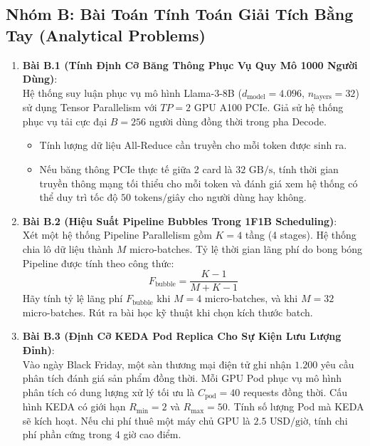\subsection{Nhóm B: Bài Toán Tính Toán Giải Tích Bằng Tay (Analytical Problems)}
\begin{enumerate}
  \item \textbf{Bài B.1 (Tính Định Cỡ Băng Thông Phục Vụ Quy Mô 1000 Người Dùng)}: \\
  Hệ thống suy luận phục vụ mô hình Llama-3-8B ($d_{\text{model}} = 4.096$, $n_{\text{layers}} = 32$) sử dụng Tensor Parallelism với $TP = 2$ GPU A100 PCIe.
  Giả sử hệ thống phục vụ tải cực đại $B = 256$ người dùng đồng thời trong pha Decode.
  \begin{itemize}
    \item[a)] Tính lượng dữ liệu All-Reduce cần truyền cho mỗi token được sinh ra.
    \item[b)] Nếu băng thông PCIe thực tế giữa 2 card là $32\text{ GB/s}$, tính thời gian truyền thông mạng tối thiểu cho mỗi token và đánh giá xem hệ thống có thể duy trì tốc độ $50\text{ tokens/giây}$ cho người dùng hay không.
  \end{itemize}

  \item \textbf{Bài B.2 (Hiệu Suất Pipeline Bubbles Trong 1F1B Scheduling)}: \\
  Xét một hệ thống Pipeline Parallelism gồm $K = 4$ tầng (4 stages).
  Hệ thống chia lô dữ liệu thành $M$ micro-batches.
  Tỷ lệ thời gian lãng phí do bong bóng Pipeline được tính theo công thức:
  \begin{equation*}
  F_{\text{bubble}} = \frac{K - 1}{M + K - 1}
  \end{equation*}
  Hãy tính tỷ lệ lãng phí $F_{\text{bubble}}$ khi $M = 4$ micro-batches, và khi $M = 32$ micro-batches. Rút ra bài học kỹ thuật khi chọn kích thước batch.

  \item \textbf{Bài B.3 (Định Cỡ KEDA Pod Replica Cho Sự Kiện Lưu Lượng Đỉnh)}: \\
  Vào ngày Black Friday, một sàn thương mại điện tử ghi nhận $1.200$ yêu cầu phân tích đánh giá sản phẩm đồng thời.
  Mỗi GPU Pod phục vụ mô hình phân tích có dung lượng xử lý tối ưu là $C_{\text{pod}} = 40$ requests đồng thời.
  Cấu hình KEDA có giới hạn $R_{\min} = 2$ và $R_{\max} = 50$.
  Tính số lượng Pod mà KEDA sẽ kích hoạt. Nếu chi phí thuê một máy chủ GPU là $2.5\text{ USD/giờ}$, tính chi phí phần cứng trong 4 giờ cao điểm.


\end{enumerate}
